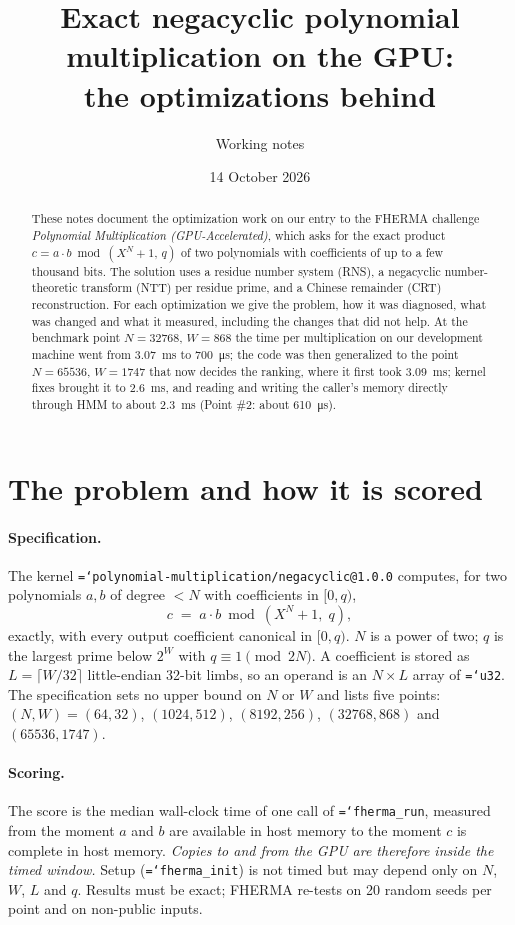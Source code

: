 \documentclass[11pt,a4paper]{article}
\title{Exact negacyclic polynomial multiplication on the GPU:\\
       the optimizations behind \code{fherma-polymul}}
\author{Working notes}
\date{14 October 2026}
\newcommand{\code}[1]{\texttt{\hyphenchar\font=`\-\relax #1}}
\newcommand{\us}[1]{\SI{#1}{\micro\second}}
\newcommand{\ms}[1]{\SI{#1}{\milli\second}}
\begin{document}
\maketitle

\begin{abstract}
These notes document the optimization work on our entry to the FHERMA challenge
\emph{Polynomial Multiplication (GPU-Accelerated)}, which asks for the exact
product $c = a\cdot b \bmod (X^N+1,\, q)$ of two polynomials with coefficients
of up to a few thousand bits. The solution uses a residue number system (RNS),
a negacyclic number-theoretic transform (NTT) per residue prime, and a Chinese
remainder (CRT) reconstruction. For each optimization we give the problem, how
it was diagnosed, what was changed and what it measured, including the changes
that did not help. At the benchmark point $N = 32768$, $W = 868$ the time per
multiplication on our development machine went from \ms{3.07} to \us{700}; the
code was then generalized to the point $N = 65536$, $W = 1747$ that now decides
the ranking, where it first took \ms{3.09}; kernel fixes brought it to \ms{2.6}, and
reading and writing the caller's memory directly through HMM to about \ms{2.3}
(Point \#2: about \us{610}).
\end{abstract}

\tableofcontents

\section{The problem and how it is scored}

\paragraph{Specification.} The kernel
\code{polynomial-multiplication/negacyclic@1.0.0} computes, for two polynomials $a, b$ of degree $< N$ with coefficients in $[0,q)$,
\[
  c \;=\; a \cdot b \bmod (X^N + 1,\; q),
\]
exactly, with every output coefficient canonical in $[0, q)$. $N$ is a power of two;
$q$ is the largest prime below $2^W$ with $q \equiv 1 \pmod{2N}$. A coefficient is
stored as $L = \lceil W/32 \rceil$ little-endian 32-bit limbs, so an operand is an
$N \times L$ array of \code{u32}. The specification sets no upper bound on $N$ or $W$
and lists five points: $(N,W) = (64,32)$, $(1024,512)$, $(8192,256)$, $(32768,868)$
and $(65536,1747)$.

\paragraph{Scoring.} The score is the median wall-clock time of one call of
\code{fherma\_run}, measured from the moment $a$ and $b$ are available in host
memory to the moment $c$ is complete in host memory. \emph{Copies to and from the
GPU are therefore inside the timed window.} Setup (\code{fherma\_init}) is not
timed but may depend only on $N$, $W$, $L$ and $q$. Results must be exact; FHERMA
re-tests on 20 random seeds per point and on non-public inputs.
\end{document}
